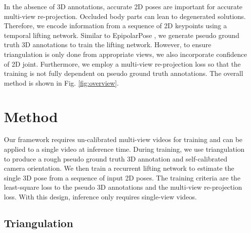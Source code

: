 \documentclass[10pt,twocolumn,letterpaper]{article}
\begin{document}
In the absence of 3D annotations, accurate 2D poses are important for accurate multi-view re-projection. Occluded body parts can lean to degenerated solutions. Therefore, we encode information from a sequence of 2D keypoints using a temporal lifting network. Similar to EpipolarPose \cite{Kocabas_2019_CVPR}, we generate pseudo ground truth 3D annotations to train the lifting network. However, to ensure triangulation is only done from appropriate views, we also incorporate confidence of 2D joint. Furthermore, we employ a multi-view re-projection loss so that the training is not fully dependent on pseudo ground truth annotations. The overall method is shown in Fig. \ref{fig:overview}.    

\section{Method}
Our framework requires un-calibrated multi-view videos for training and can be applied to a single video at inference time. During training, we use triangulation to produce a rough pseudo ground truth 3D annotation and self-calibrated camera orientation. We then train a recurrent lifting network to estimate the single 3D pose from a sequence of input 2D poses. The training criteria are the least-square loss to the pseudo 3D annotations and the multi-view re-projection loss. With this design, inference only requires single-view videos. 

\subsection{Triangulation}
\label{sec:triangulation}
\end{document}
